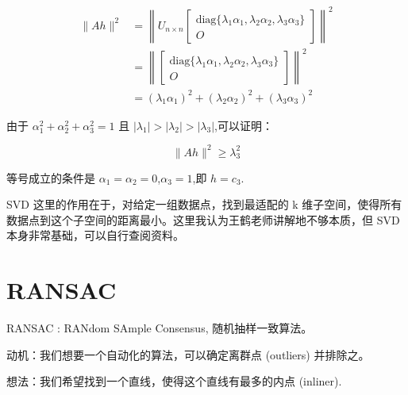 $$
\begin{aligned}
\|Ah\|^2 &= \left\| U_{n \times n} \begin{bmatrix} \text{diag}\{\lambda_1 \alpha_1, \lambda_2 \alpha_2, \lambda_3 \alpha_3\} \\ O \end{bmatrix} \right\|^2 \\
&= \left\| \begin{bmatrix} \text{diag}\{\lambda_1 \alpha_1, \lambda_2 \alpha_2, \lambda_3 \alpha_3\} \\ O \end{bmatrix} \right\|^2 \\
&= (\lambda_1 \alpha_1)^2 + (\lambda_2 \alpha_2)^2 + (\lambda_3 \alpha_3)^2
\end{aligned}
$$

由于 $\alpha_1^2 + \alpha_2^2 + \alpha_3^2 = 1$ 且 $|\lambda_1| > |\lambda_2| > |\lambda_3|$,可以证明：

$$
\|Ah\|^2 \geq \lambda_3^2
$$

等号成立的条件是 $\alpha_1 = \alpha_2 = 0$,$\alpha_3 = 1$,即 $h = c_3$.

SVD 这里的作用在于，对给定一组数据点，找到最适配的 k 维子空间，使得所有数据点到这个子空间的距离最小。这里我认为王鹤老师讲解地不够本质，但 SVD 本身非常基础，可以自行查阅资料。

\section{RANSAC}

RANSAC : RANdom SAmple Consensus, 随机抽样一致算法。

动机：我们想要一个自动化的算法，可以确定离群点 (outliers) 并排除之。

想法：我们希望找到一个直线，使得这个直线有最多的内点 (inliner).


